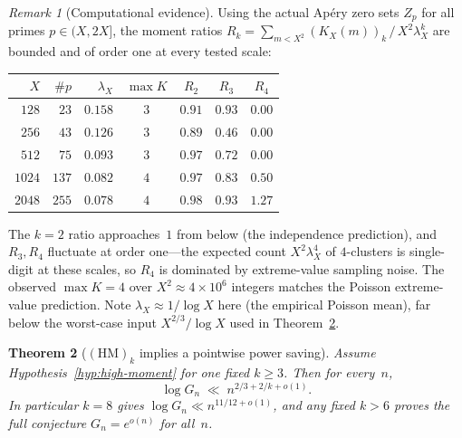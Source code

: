\documentclass[11pt]{article}
\newtheorem{theorem}{Theorem}
\theoremstyle{definition}
\theoremstyle{remark}
\newtheorem{remark}[theorem]{Remark}
\begin{document}
\begin{remark}[Computational evidence]\label{rem:hm-data}
Using the actual Ap\'ery zero sets $Z_p$ for all primes
$p \in (X, 2X]$, the moment ratios
$R_k = \sum_{m<X^2}(K_X(m))_k \,/\, X^2\lambda_X^k$
are bounded and of order one at every tested scale:
\begin{center}
\begin{tabular}{rrrcccc}
\toprule
$X$ & $\#p$ & $\lambda_X$ & $\max K$ &
$R_2$ & $R_3$ & $R_4$ \\
\midrule
$128$  & $23$  & $0.158$ & $3$ & $0.91$ & $0.93$ & $0.00$ \\
$256$  & $43$  & $0.126$ & $3$ & $0.89$ & $0.46$ & $0.00$ \\
$512$  & $75$  & $0.093$ & $3$ & $0.97$ & $0.72$ & $0.00$ \\
$1024$ & $137$ & $0.082$ & $4$ & $0.97$ & $0.83$ & $0.50$ \\
$2048$ & $255$ & $0.078$ & $4$ & $0.98$ & $0.93$ & $1.27$ \\
\bottomrule
\end{tabular}
\end{center}
The $k = 2$ ratio approaches~$1$ from below (the
independence prediction), and $R_3, R_4$ fluctuate at
order one---the expected count $X^2\lambda_X^4$ of
$4$-clusters is single-digit at these scales, so $R_4$
is dominated by extreme-value sampling noise.
The observed $\max K = 4$ over $X^2 \approx 4 \times 10^6$
integers matches the Poisson extreme-value prediction.
Note $\lambda_X \approx 1/\log X$ here (the empirical
Poisson mean), far below the worst-case input
$X^{2/3}/\log X$ used in
Theorem~\ref{thm:hm-pointwise}.
\end{remark}

\begin{theorem}[$(\mathrm{HM})_k$ implies a pointwise power
saving]\label{thm:hm-pointwise}
Assume Hypothesis~\ref{hyp:high-moment} for one fixed
$k \ge 3$. Then for \emph{every}~$n$,
\[
  \log G_n \;\ll\; n^{2/3 + 2/k + o(1)}.
\]
In particular $k = 8$ gives
$\log G_n \ll n^{11/12 + o(1)}$, and any fixed $k > 6$
proves the full conjecture $G_n = e^{o(n)}$ for all~$n$.
\end{theorem}
\end{document}
